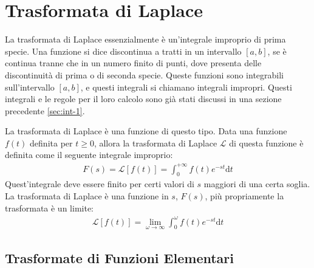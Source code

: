 \documentclass{article}
\newcommand{\df}{\mathrm{d}}
\newcommand{\intab}[4]{\displaystyle\int_{#1}^{#2}{#3}\df{#4}}
\newcommand{\intpinf}[2]{\intab{0}{+\infty}{#1}{#2}}
\numberwithin{equation}{subsection}
\begin{document}


\clearpage

\section{Trasformata di Laplace}

La trasformata di Laplace essenzialmente è un'integrale improprio di prima specie. 
Una funzione si dice discontinua a tratti in un intervallo $[a,b]$, se è continua tranne che in un numero finito di punti, dove presenta delle discontinuità di prima o di seconda specie. Queste funzioni sono integrabili sull'intervallo $[a,b]$, e questi integrali si chiamano integrali impropri. Questi integrali e le regole per il loro calcolo sono già stati discussi in una sezione precedente \ref{sec:int-1}. 

La trasformata di Laplace è una funzione di questo tipo. Data una funzione $f(t)$ definita per $t\geq0$, allora la trasformata di Laplace $\mathcal{L}$ di questa funzione è definita come il seguente integrale improprio:
\begin{gather}
    F(s)=\mathcal{L}[f(t)]=\intpinf{f(t)e^{-st}}{t}
\end{gather}
Quest'integrale deve essere finito per certi valori di $s$ maggiori di una certa soglia. La trasformata di Laplace è una funzione in $s$, $F(s)$, più propriamente la trasformata è un limite:
\begin{gather}
    \mathcal{L}[f(t)]=\lim_{\omega\to\infty}\int_0^\omega f(t)e^{-st}\df t
\end{gather}

\subsection{Trasformate di Funzioni Elementari}
\end{document}
